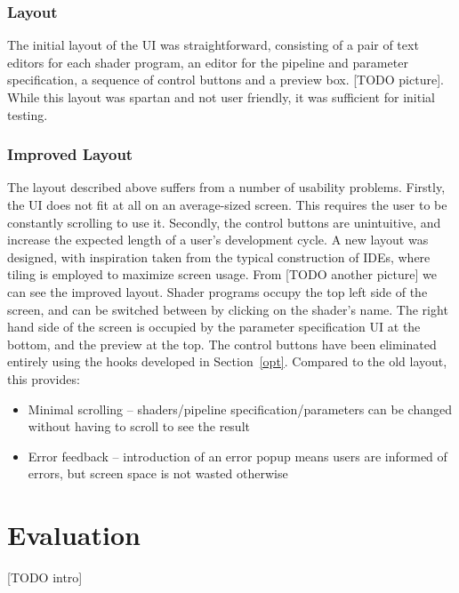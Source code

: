 \documentclass[12pt,twoside,notitlepage]{report}
\begin{document}
\subsection{Layout}
The initial layout of the UI was straightforward, consisting of a pair of text editors for each shader program, an editor for the pipeline and parameter specification, a sequence of control buttons and a preview box. [TODO picture]. While this layout was spartan and not user friendly, it was sufficient for initial testing.
\subsection{Improved Layout}
The layout described above suffers from a number of usability problems. Firstly, the UI does not fit at all on an average-sized screen. This requires the user to be constantly scrolling to use it. Secondly, the control buttons are unintuitive, and increase the expected length of a user's development cycle. A new layout was designed, with inspiration taken from the typical construction of IDEs, where tiling is employed to maximize screen usage. From [TODO another picture] we can see the improved layout. Shader programs occupy the top left side of the screen, and can be switched between by clicking on the shader's name. The right hand side of the screen is occupied by the parameter specification UI at the bottom, and the preview at the top. The control buttons have been eliminated entirely using the hooks developed in Section~\ref{opt}. Compared to the old layout, this provides:
\begin{itemize}
\item Minimal scrolling -- shaders/pipeline specification/parameters can be changed without having to scroll to see the result
\item Error feedback -- introduction of an error popup means users are informed of errors, but screen space is not wasted otherwise
\end{itemize}
\cleardoublepage
\chapter{Evaluation}
[TODO intro]
\end{document}
